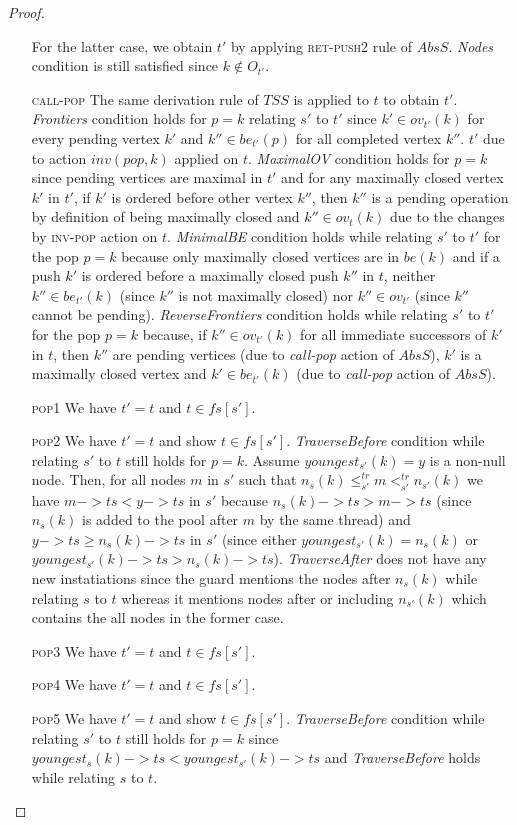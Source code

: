 \documentclass{article}
\begin{document}
\begin{proof}
\begin{itemize}
For the latter case, we obtain $t'$ by applying \textsc{ret-push2} rule of $AbsS$. \emph{Nodes} condition is still satisfied since $k \notin O_{t'}$. 
\item[\textsc{call-pop}] The same derivation rule of $TSS$ is applied to $t$  to obtain $t'$. \emph{Frontiers} condition holds for $p = k$ relating $s'$ to $t'$ since $k' \in ov_{t'}(k)$ for every pending vertex $k'$ and $k'' \in be_{t'}(p)$ for all completed vertex $k''$. $t'$ due to action $inv(pop,k)$ applied on $t$. \emph{MaximalOV} condition holds for $p = k$ since pending vertices are maximal in $t'$ and for any maximally closed vertex $k'$ in $t'$, if $k'$ is ordered before other vertex $k''$, then $k''$ is a pending operation by definition of being maximally closed and $k'' \in ov_t(k)$ due to the changes by \textsc{inv-pop} action on $t$. \emph{MinimalBE} condition holds while relating $s'$ to $t'$ for the pop $ p = k$ because only maximally closed vertices are in $be(k)$ and if a push $k'$ is ordered before a maximally closed push $k''$ in $t$, neither $k'' \in be_{t'}(k)$ (since $k''$ is not maximally closed) nor $k'' \in ov_{t'}$ (since $k''$ cannot be pending). \emph{ReverseFrontiers} condition holds while relating $s'$ to $t'$ for the pop $p=k$ because, if $k'' \in ov_{t'}(k)$ for all immediate successors of $k'$ in $t$, then $k'' $ are pending vertices (due to \emph{call-pop} action of $AbsS$), $k'$ is a maximally closed vertex and $k' \in be_{t'}(k)$ (due to \emph{call-pop} action of $AbsS$).
\item[\textsc{pop1}]We have $t' = t$ and $t \in fs[s']$.
\item[\textsc{pop2}]We have $t' = t$ and show $t \in fs[s']$. \emph{TraverseBefore} condition while relating $s'$ to $t$ still holds for $p=k$. Assume $youngest_{s'}(k) = y$ is a non-null node. Then, for all nodes $m$ in $s'$ such that $n_s(k) \leq^{tr}_{s'} m <^{tr}_{s'} n_{s'}(k)$ we have $m->ts < y->ts$ in $s'$ because  $n_s(k)->ts > m->ts$ (since $n_s(k)$ is added to the pool after $m$ by the same thread) and $y->ts \geq n_s(k)->ts$ in $s'$ (since either $youngest_{s'}(k) = n_s(k)$ or $youngest_{s'}(k)->ts > n_s(k)->ts$). \emph{TraverseAfter} does not have any new instatiations since the guard mentions the nodes after $n_s(k)$ while relating $s$ to $t$ whereas it mentions nodes after or including $n_{s'}(k)$ which contains the all nodes in the former case.
\item[\textsc{pop3}]We have $t' = t$ and $t \in fs[s']$.
\item[\textsc{pop4}]We have $t' = t$ and $t \in fs[s']$.
\item[\textsc{pop5}]We have $t' = t$ and show $t \in fs[s']$. 
\emph{TraverseBefore} condition while relating $s'$ to $t$ still holds for $p=k$ since $youngest_s(k)->ts < youngest_{s'}(k)->ts$ and \emph{TraverseBefore} holds while relating $s$ to $t$. 


\end{itemize}
\end{proof}
\end{document}
